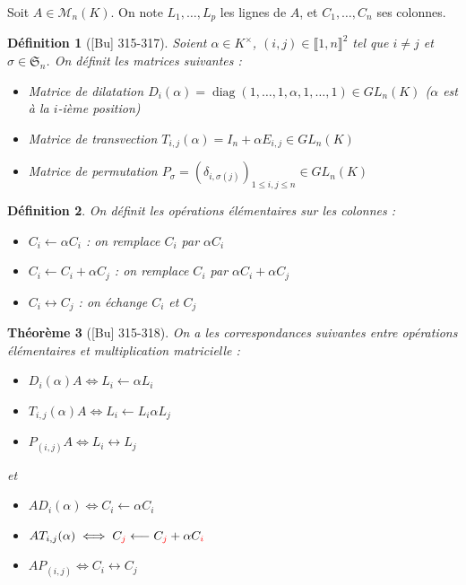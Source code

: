 \documentclass[10pt, a4paper, parskip=full, twoside, twocolumn]{report}
\newtheorem{definition}{Définition}
\newtheorem{theorem}[definition]{Théorème}
\newcommand{\M}{\mathcal{M}}
\DeclareMathOperator{\diag}{diag}
\begin{document}
\textcolor{paragraphtext}{Soit $A\in\M_n(K)$. On note $L_1,\dots, L_p$ les lignes de $A$, et $C_1,\dots, C_n$ ses colonnes.}

\begin{definition}[\textnormal{[Bu] 315-317}]
	Soient $\alpha \in K^{\times}$, $(i,j)\in\llbracket 1,n\rrbracket^2$ tel que $i\neq j$ et $\sigma\in\mathfrak{S}_n$. On définit les matrices suivantes :
	\begin{itemize}
		\item Matrice de \emph{dilatation} $D_i(\alpha) = \diag(1,\dots, 1, \alpha,1,\dots, 1)\in GL_n(K)$ ($\alpha$ est à la $i$-ième position)
		\item Matrice de \emph{transvection} $T_{i,j}(\alpha) = I_n + \alpha E_{i,j}\in GL_n(K)$
		\item Matrice de \emph{permutation} $P_{\sigma} = \left(\delta_{i,\sigma(j)}\right)_{1\leq i,j\leq n}\in GL_n(K)$
	\end{itemize}
\end{definition}

\begin{definition}
	On définit les \emph{opérations élémentaires} sur les colonnes :
	\begin{itemize}
		\item $C_i \longleftarrow \alpha C_i$ : on remplace $C_i$ par $\alpha C_i$
		\item $C_i \longleftarrow C_i + \alpha C_j$ : on remplace $C_i$ par $\alpha C_i+\alpha C_j$
		\item $C_i \longleftrightarrow C_j$ : on échange $C_i$ et $C_j$
	\end{itemize}
\end{definition}

\begin{theorem}[\textnormal{[Bu] 315-318}]
	On a les correspondances suivantes entre opérations élémentaires et multiplication matricielle :
	\begin{itemize}
		\item $D_i(\alpha)A\iff L_i \longleftarrow \alpha L_i$
		\item $T_{i,j}(\alpha)A\iff L_i \longleftarrow L_i \alpha L_j$
		\item $P_{(i,j)}A\iff L_i \longleftrightarrow L_j$
	\end{itemize}
	et 
	\begin{itemize}
		\item $A D_i(\alpha)\iff C_i \longleftarrow \alpha C_i$
		\item $AT_{i,j}(\alpha)\iff C_{\textcolor{red}{j}} \longleftarrow C_{\textcolor{red}{j}} + \alpha C_{\textcolor{red}{i}}$
		\item $AP_{(i,j)}\iff C_i \longleftrightarrow C_j$
	\end{itemize}
\end{theorem}
\end{document}
